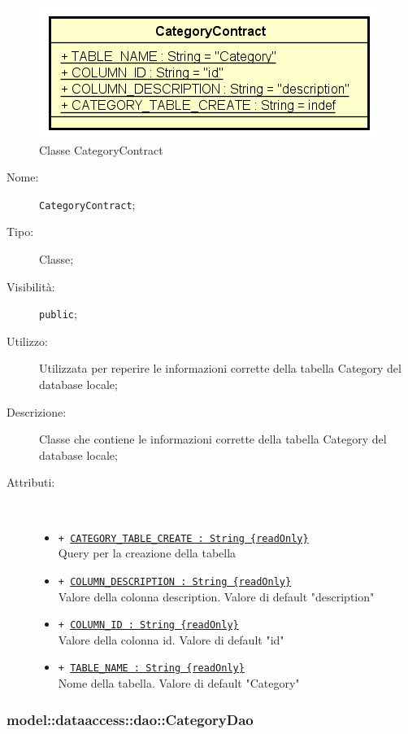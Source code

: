 \documentclass[../DefinizioneDiProdotto.tex]{subfiles}
\begin{document}
    \begin{figure}[H]
        \centering
        \includegraphics{img/CategoryContract.png}
        \caption{Classe CategoryContract}\label{fig:model::dataaccess::dao::CategoryContract} 
    \end{figure}
    \begin{description}
\item[Nome:] \texttt{CategoryContract};
\item[Tipo:] Classe;
\item[Visibilità:] \texttt{public};
\item[Utilizzo:] Utilizzata per reperire le informazioni corrette della tabella Category del database locale;
\item[Descrizione:] Classe che contiene le informazioni corrette della tabella Category del database locale;
\item[Attributi:] \
\begin{itemize}
\item \texttt{+ \underline{CATEGORY\_TABLE\_CREATE : String \{readOnly\}}}\\
Query per la creazione della tabella

\item \texttt{+ \underline{COLUMN\_DESCRIPTION : String \{readOnly\}}}\\
Valore della colonna description. Valore di default "description"

\item \texttt{+ \underline{COLUMN\_ID : String \{readOnly\}}}\\
Valore della colonna id. Valore di default "id"

\item \texttt{+ \underline{TABLE\_NAME : String \{readOnly\}}}\\
Nome della tabella. Valore di default "Category"

\end{itemize}
\end{description}

\subsubsection{model::dataaccess::dao::CategoryDao}
\end{document}
